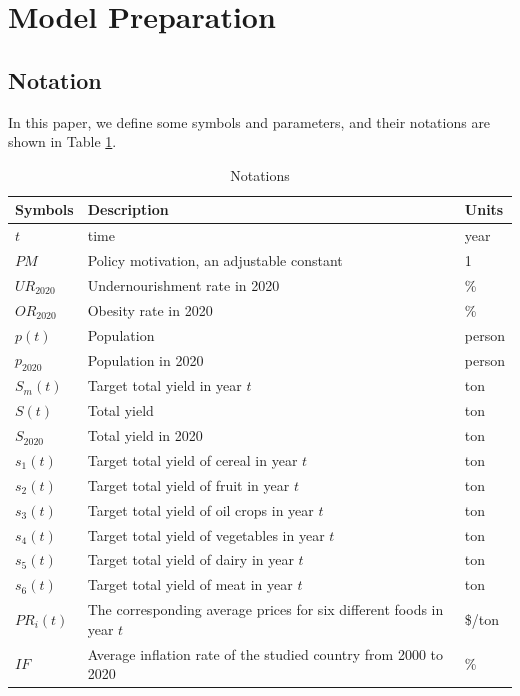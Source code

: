 \documentclass[12pt]{article}
\begin{document}
\section{Model Preparation}
\subsection{Notation}

In this paper, we define some symbols and parameters, and their notations are shown in Table \ref{tab:notation}.


\begin{table}[!h]
    \centering
    \caption{\label{tab:notation} Notations}
    \vspace{1em}
    \begin{tabular}{lll}
        \toprule
        Symbols & Description & Units \\
        \midrule
        $t$ & time & year \\
        $PM$ & Policy motivation, an adjustable constant & 1 \\
        $UR_{2020}$ & Undernourishment rate in 2020 & \% \\
        $OR_{2020}$ & Obesity rate in 2020 & \% \\
        $p(t)$ & Population & person\\
        $p_{2020}$ & Population in 2020 & person \\
        $S_m(t)$ & Target total yield in year $t$ & ton \\
        $S(t)$ & Total yield & ton \\
        $S_{2020}$ & Total yield in 2020 & ton \\
        $s_1(t)$ &Target total yield of cereal in year $t$& ton\\
        $s_2(t)$ &Target total yield of fruit in year $t$& ton\\
        $s_3(t)$ &Target total yield of oil crops in year $t$& ton\\
        $s_4(t)$ &Target total yield of vegetables in year $t$& ton\\
        $s_5(t)$ &Target total yield of dairy in year $t$& ton\\
        $s_6(t)$ &Target total yield of meat in year $t$& ton \\
        $PR_i(t)$ &The corresponding average prices for six different foods in year $t$ & \$/ton \\
        $IF$ &Average inflation rate of the studied country from 2000 to 2020 & \%\\

\end{tabular}
\end{table}
\end{document}
